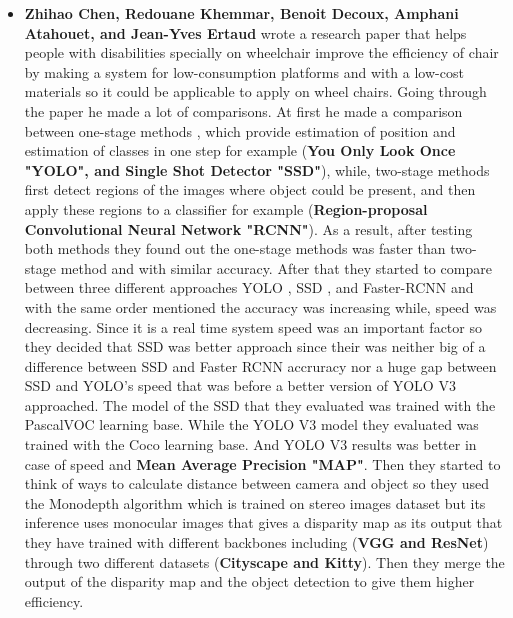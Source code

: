\documentclass[12pt]{article}
\begin{document}
\begin{itemize}
        \item \textbf{Zhihao Chen, Redouane Khemmar, Benoit Decoux, Amphani Atahouet, and Jean-Yves Ertaud} \cite{8806222} wrote a research paper that helps people with disabilities specially on wheelchair improve the efficiency of chair by making a system for low-consumption platforms and with a low-cost materials so it could be applicable to apply on wheel chairs. Going through the paper he made a lot of comparisons. At first he made a comparison between one-stage methods , which provide estimation of position and estimation of classes in one step for example (\textbf{You Only Look Once "YOLO", and Single Shot Detector "SSD"}),
        while, two-stage methods first detect regions of the images where object could be present, and then apply these regions to a classifier for example (\textbf{Region-proposal Convolutional Neural Network "RCNN"}). As a result, after testing both methods they found out the one-stage methods was faster than two-stage method and with similar accuracy. After that they started to compare between three different approaches YOLO , SSD , and Faster-RCNN and with the same order mentioned the accuracy was increasing while, speed was decreasing. Since it is a real time system speed was an important factor so they decided that SSD was better approach since their was neither big of a difference between SSD and Faster RCNN accruracy nor a huge gap between SSD and YOLO's speed that was before a better version of YOLO V3 approached. The model of the SSD that they evaluated was trained with the PascalVOC learning base. While the YOLO V3 model they evaluated was trained with the Coco learning base. And YOLO V3 results was better in case of speed and \textbf{ Mean Average Precision "MAP"}. Then they started to think of ways to calculate distance between camera and object so they used the Monodepth algorithm which is trained on stereo images dataset but its inference uses monocular images that gives a disparity map as its output that they have trained with different backbones including (\textbf{VGG and ResNet}) through two different datasets (\textbf{Cityscape and Kitty}). Then they merge the output of the disparity map and the object detection to give them higher efficiency. 


\end{itemize}
\end{document}
